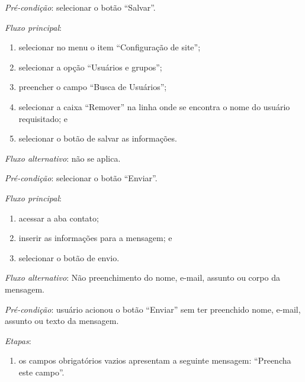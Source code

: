 \documentclass[a4paper,12pt]{article}
\begin{document}
\vspace{0.7cm}

\noindent \textit{Pré-condição}: selecionar o botão ``Salvar''.

\noindent \textit{Fluxo principal}:

\begin{enumerate}
    \item selecionar no menu o item ``Configuração de site'';
    \item selecionar a opção ``Usuários e grupos'';
    \item preencher o campo ``Busca de Usuários'';
    \item selecionar a caixa ``Remover'' na linha onde se encontra o nome do usuário requisitado; e
    \item selecionar o botão de salvar as informações.
\end{enumerate}

\noindent \textit{Fluxo alternativo}: não se aplica.


\vspace{0.7cm}

\noindent \textit{Pré-condição}: selecionar o botão ``Enviar''.

\noindent \textit{Fluxo principal}:

\begin{enumerate}
    \item acessar a aba contato;
    \item inserir as informações para a mensagem; e
    \item selecionar o botão de envio.
\end{enumerate}

\noindent \textit{Fluxo alternativo}: Não preenchimento do nome, e-mail, assunto ou corpo da mensagem.

\noindent \textit{Pré-condição}: usuário acionou o botão ``Enviar'' sem ter preenchido nome, e-mail, assunto ou texto da mensagem.

\noindent \textit{Etapas}:

\begin{enumerate}
    \item os campos obrigatórios vazios apresentam a seguinte mensagem: ``Preencha este campo''.
\end{enumerate}

\end{document}
